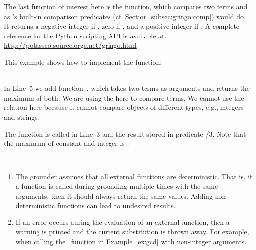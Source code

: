 The last function of interest here is the  function,
which compares two terms  and 
as \gringo's built-in comparison predicates (cf. Section \ref{subsec:gringo:comp}) would do.
It returns a negative integer if , zero if , and a positive integer if .
A complete reference for the Python scripting API is available at: \url{http://potassco.sourceforge.net/gringo.html}
\begin{example}
This example shows how to implement the  function:
\\[-8pt] %
\begin{minipage}[t]{0.57\textwidth}

\end{minipage}
\begin{minipage}[t]{0.45\textwidth}

\end{minipage}\\
In Line~5 we add function~,
which takes two terms as arguments
and returns the maximum of both.
We are using the  here to compare terms.
We cannot use the \code{>} relation here
because it cannot compare objects of different types,
e.g., integers and strings.

%
%
The function is called in Line~3 and the result stored in predicate /$3$.
Note that the maximum of constant  and integer  is .
\eexample
\end{example}

\begin{note}~
\begin{enumerate}
\item The grounder assumes that all external functions are deterministic.
That is, if a function is called during grounding multiple times with the same arguments,
then it should always return the same values.
Adding non-deterministic functions can lead to undesired results.
\item If an error occurs during the evaluation of an external function,
then a warning is printed and the current substitution is thrown away.
For example, when calling the~ function in Example~\ref{ex:gcd} with non-integer arguments.
\end{enumerate}
\end{note}

